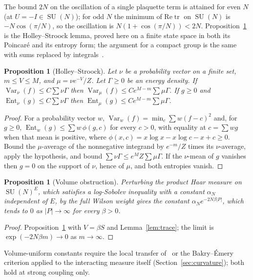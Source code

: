 \documentclass[aps,prd,twocolumn,superscriptaddress,nofootinbib,floatfix]{revtex4-2}
\newtheorem{proposition}[theorem]{Proposition}
\theoremstyle{definition}
\theoremstyle{remark}
\DeclareMathOperator{\SU}{SU}
\DeclareMathOperator{\Tr}{tr}
\DeclareMathOperator{\Var}{Var}
\DeclareMathOperator{\Ent}{Ent}
\begin{document}
The bound $2N$ on the oscillation of a single plaquette term is attained
for even $N$ (at $U=-I\in\SU(N)$); for odd $N$ the minimum of
$\mathrm{Re}\Tr$ on $\SU(N)$ is $-N\cos(\pi/N)$, so the oscillation is
$N(1+\cos(\pi/N))<2N$. Proposition~\ref{prop:HS} is the Holley--Stroock
lemma, proved here on a finite state space in both its Poincar\'e and its
entropy form; the argument for a compact group is the same with sums
replaced by integrals~\cite{HS87}.

\begin{proposition}[Holley--Stroock]
\label{prop:HS}
Let $\nu$ be a probability vector on a finite set, $m\le V\le M$, and
$\mu=\nu e^{-V}/Z$. Let $\Gamma\ge0$ be an energy density. If
$\Var_\nu(f)\le C\sum\nu\Gamma$ then $\Var_\mu(f)\le Ce^{M-m}\sum\mu\Gamma$.
If $g\ge0$ and $\Ent_\nu(g)\le C\sum\nu\Gamma$ then
$\Ent_\mu(g)\le Ce^{M-m}\sum\mu\Gamma$.
\end{proposition}

\begin{proof}
For a probability vector $w$, $\Var_w(f)=\min_c\sum w(f-c)^2$ and, for
$g\ge0$, $\Ent_w(g)\le\sum w\,\phi(g,c)$ for every $c>0$, with equality at
$c=\sum wg$ when that mean is positive, where
$\phi(x,c)=x\log x-x\log c-x+c\ge0$. Bound the $\mu$-average of the
nonnegative integrand by $e^{-m}/Z$ times its $\nu$-average, apply the
hypothesis, and bound $\sum\nu\Gamma\le e^{M}Z\sum\mu\Gamma$. If the
$\nu$-mean of $g$ vanishes then $g=0$ on the support of $\nu$, hence of
$\mu$, and both entropies vanish.
\end{proof}

\begin{proposition}[Volume obstruction]
\label{prop:volume}
Perturbing the product Haar measure on $\SU(N)^E$, which satisfies a
log-Sobolev inequality with a constant $\alpha_N$ independent of $E$, by the
full Wilson weight gives the constant $\alpha_Ne^{-2N\beta|P|}$, which tends
to $0$ as $|P|\to\infty$ for every $\beta>0$.
\end{proposition}

\begin{proof}
Proposition~\ref{prop:HS} with $V=\beta S$ and Lemma~\ref{lem:trace}; the
limit is $\exp(-2N\beta m)\to0$ as $m\to\infty$.
\end{proof}

Volume-uniform constants require the local transfer of~\cite{SZ92} or the
Bakry--\'Emery criterion applied to the interacting measure itself
(Section~\ref{sec:curvature}); both hold at strong coupling only.
\end{document}
